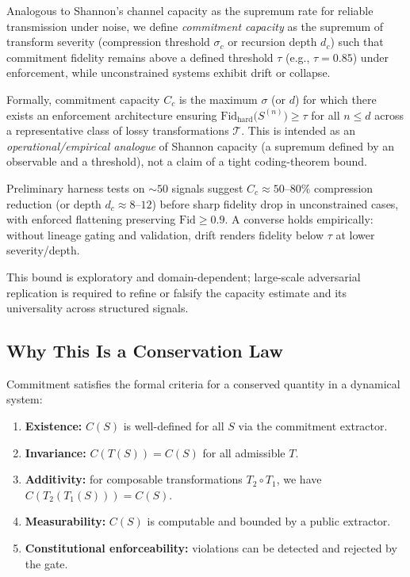 \documentclass[11pt,a4paper]{article}
\begin{document}
Analogous to Shannon's channel capacity as the supremum rate for reliable transmission under noise, we define \emph{commitment capacity} as the supremum of transform severity (compression threshold $\sigma_c$ or recursion depth $d_c$) such that commitment fidelity remains above a defined threshold $\tau$ (e.g., $\tau = 0.85$) under enforcement, while unconstrained systems exhibit drift or collapse.

Formally, commitment capacity $C_c$ is the maximum $\sigma$ (or $d$) for which there exists an enforcement architecture ensuring $\mathrm{Fid}_{\mathrm{hard}}\bigl(S^{(n)}\bigr) \geq \tau$ for all $n \leq d$ across a representative class of lossy transformations $\mathcal{T}$. This is intended as an \emph{operational/empirical analogue} of Shannon capacity (a supremum defined by an observable and a threshold), not a claim of a tight coding-theorem bound.

Preliminary harness tests on $\sim 50$ signals suggest $C_c \approx 50$--$80\%$ compression reduction (or depth $d_c \approx 8$--$12$) before sharp fidelity drop in unconstrained cases, with enforced flattening preserving $\mathrm{Fid} \geq 0.9$. A converse holds empirically: without lineage gating and validation, drift renders fidelity below $\tau$ at lower severity/depth.

This bound is exploratory and domain-dependent; large-scale adversarial replication is required to refine or falsify the capacity estimate and its universality across structured signals.

\subsection{Why This Is a Conservation Law}
\label{sec:conservation-criteria}

Commitment satisfies the formal criteria for a conserved quantity in a dynamical system:
\begin{enumerate}
    \item \textbf{Existence:} $C(S)$ is well-defined for all $S$ via the commitment extractor.
    \item \textbf{Invariance:} $C(T(S)) = C(S)$ for all admissible $T$.
    \item \textbf{Additivity:} for composable transformations $T_2 \circ T_1$, we have $C(T_2(T_1(S))) = C(S)$.
    \item \textbf{Measurability:} $C(S)$ is computable and bounded by a public extractor.
    \item \textbf{Constitutional enforceability:} violations can be detected and rejected by the gate.
\end{enumerate}
\end{document}
